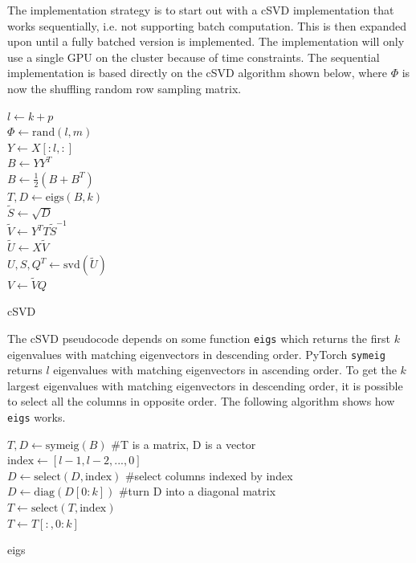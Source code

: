   
The implementation strategy is to start out with a cSVD implementation that works sequentially, i.e. not supporting batch computation. This is then expanded upon until a fully batched version is implemented. The implementation will only use a single GPU on the cluster because of time constraints. The sequential implementation is based directly on the cSVD algorithm shown below, where $\Phi$ is now the shuffling random row sampling matrix.

\begin{algorithm}[H]
\SetAlgoLined
{}
$l \gets k + p$ \\
$\Phi \gets \mathrm{rand}(l, m)$ \\
$Y \gets X[:l,:]$ \\
$B \gets Y Y^T$ \\
$B \gets \frac{1}{2}(B + B^T)$ \\
$T,D \gets \mathrm{eigs}(B,k)$ \\
$\tilde S \gets \sqrt{D}$ \\
$\tilde V \gets Y^T T \tilde S^{-1}$ \\
$\tilde U \gets X \tilde V$ \\
$U,S,Q^T \gets \mathrm{svd}(\tilde U)$ \\
$V \gets \tilde V Q$ \\
\caption{cSVD}
\end{algorithm}

The cSVD pseudocode depends on some function \texttt{eigs} which returns the first $k$ eigenvalues with matching eigenvectors in descending order. PyTorch \texttt{symeig} returns $l$ eigenvalues with matching eigenvectors in ascending order. To get the $k$ largest eigenvalues with matching eigenvectors in descending order, it is possible to select all the columns in opposite order. The following algorithm shows how \texttt{eigs} works.

\begin{algorithm}[H]
\SetAlgoLined
{}
$T,D \gets \mathrm{symeig}(B)$ \#T is a matrix, D is a vector \\
$\mathrm{index} \gets [l-1, l-2,..., 0]$ \\
$D \gets \mathrm{select}(D, \mathrm{index})$ \#select columns indexed by index \\
$D \gets \mathrm{diag}(D[0:k])$ \#turn D into a diagonal matrix \\
$T \gets \mathrm{select}(T, \mathrm{index})$ \\
$T \gets T[:,0:k]$ \\
\caption{eigs}
\label{alg:eigs}
\end{algorithm}

